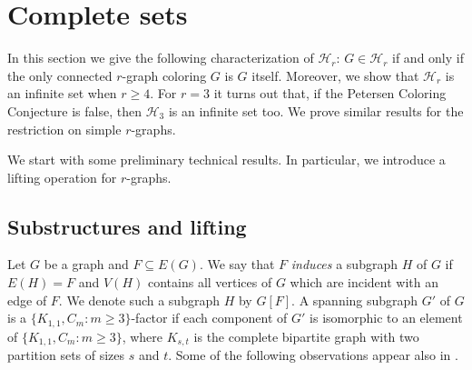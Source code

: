 \documentclass[a4paper,11pt]{article}
\newcommand{\ca}{\mathcal}
\theoremstyle{remark}
\begin{document}
\section{Complete sets} \label{Sec: H-coloring}

In this section we give the following characterization of $\ca H_r$: $G\in \ca H_r$ if and only if the only connected $r$-graph coloring $G$ is $G$ itself. Moreover, we show that $\ca H_r$ is an infinite set when $r\ge 4$. For $r=3$ it turns out that, if the Petersen Coloring Conjecture is false, then $\ca H_3$ is an infinite set too.
We prove similar results for the restriction on simple $r$-graphs.

We start with some preliminary technical results. In particular, we introduce a lifting operation for $r$-graphs.


\subsection{Substructures and lifting}

Let $G$ be a graph and $F \subseteq E(G)$. We say that $F$ \emph{induces} a subgraph $H$
of $G$ if $E(H) = F$ and $V(H)$ contains all vertices of $G$ which are incident with
an edge of $F$. We denote such a subgraph $H$ by $G[F]$. 
A spanning subgraph $ G' $ of $ G $ is a 
$ \{K_{1,1}, C_m\colon m\geq3\} $-factor if each component of $ G' $ is isomorphic to an element of $ \{K_{1,1}, C_m\colon m\geq3\} $, where $ K_{s,t} $ is the complete bipartite graph with two partition sets of sizes $ s $ and $ t $.
Some of the following observations appear also in  \cite{MTZ_r_graphs}.
\end{document}
